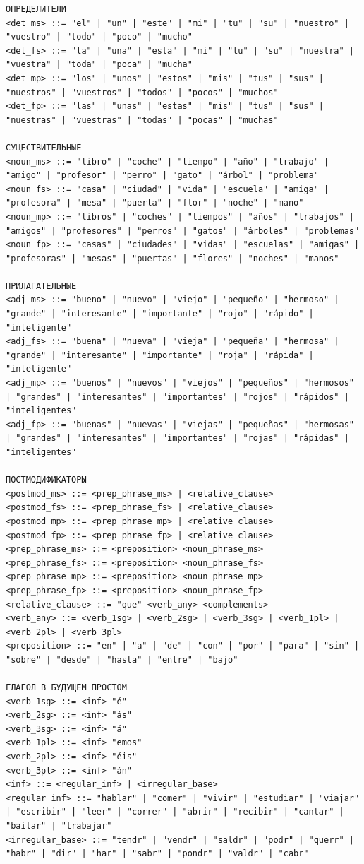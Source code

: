 \documentclass[a4paper,final]{article}
\begin{document}
{\begin{lstlisting}[caption = {Грамматика подмножества языка в БНФ}]
ОПРЕДЕЛИТЕЛИ
<det_ms> ::= "el" | "un" | "este" | "mi" | "tu" | "su" | "nuestro" | "vuestro" | "todo" | "poco" | "mucho"
<det_fs> ::= "la" | "una" | "esta" | "mi" | "tu" | "su" | "nuestra" | "vuestra" | "toda" | "poca" | "mucha"
<det_mp> ::= "los" | "unos" | "estos" | "mis" | "tus" | "sus" | "nuestros" | "vuestros" | "todos" | "pocos" | "muchos"
<det_fp> ::= "las" | "unas" | "estas" | "mis" | "tus" | "sus" | "nuestras" | "vuestras" | "todas" | "pocas" | "muchas"

СУЩЕСТВИТЕЛЬНЫЕ
<noun_ms> ::= "libro" | "coche" | "tiempo" | "año" | "trabajo" | "amigo" | "profesor" | "perro" | "gato" | "árbol" | "problema"
<noun_fs> ::= "casa" | "ciudad" | "vida" | "escuela" | "amiga" | "profesora" | "mesa" | "puerta" | "flor" | "noche" | "mano"
<noun_mp> ::= "libros" | "coches" | "tiempos" | "años" | "trabajos" | "amigos" | "profesores" | "perros" | "gatos" | "árboles" | "problemas"
<noun_fp> ::= "casas" | "ciudades" | "vidas" | "escuelas" | "amigas" | "profesoras" | "mesas" | "puertas" | "flores" | "noches" | "manos"

ПРИЛАГАТЕЛЬНЫЕ
<adj_ms> ::= "bueno" | "nuevo" | "viejo" | "pequeño" | "hermoso" | "grande" | "interesante" | "importante" | "rojo" | "rápido" | "inteligente"
<adj_fs> ::= "buena" | "nueva" | "vieja" | "pequeña" | "hermosa" | "grande" | "interesante" | "importante" | "roja" | "rápida" | "inteligente"
<adj_mp> ::= "buenos" | "nuevos" | "viejos" | "pequeños" | "hermosos" | "grandes" | "interesantes" | "importantes" | "rojos" | "rápidos" | "inteligentes"
<adj_fp> ::= "buenas" | "nuevas" | "viejas" | "pequeñas" | "hermosas" | "grandes" | "interesantes" | "importantes" | "rojas" | "rápidas" | "inteligentes"

ПОСТМОДИФИКАТОРЫ
<postmod_ms> ::= <prep_phrase_ms> | <relative_clause>
<postmod_fs> ::= <prep_phrase_fs> | <relative_clause>
<postmod_mp> ::= <prep_phrase_mp> | <relative_clause>
<postmod_fp> ::= <prep_phrase_fp> | <relative_clause>
<prep_phrase_ms> ::= <preposition> <noun_phrase_ms>
<prep_phrase_fs> ::= <preposition> <noun_phrase_fs>
<prep_phrase_mp> ::= <preposition> <noun_phrase_mp>
<prep_phrase_fp> ::= <preposition> <noun_phrase_fp>
<relative_clause> ::= "que" <verb_any> <complements>
<verb_any> ::= <verb_1sg> | <verb_2sg> | <verb_3sg> | <verb_1pl> | <verb_2pl> | <verb_3pl>
<preposition> ::= "en" | "a" | "de" | "con" | "por" | "para" | "sin" | "sobre" | "desde" | "hasta" | "entre" | "bajo"

ГЛАГОЛ В БУДУЩЕМ ПРОСТОМ
<verb_1sg> ::= <inf> "é"
<verb_2sg> ::= <inf> "ás"
<verb_3sg> ::= <inf> "á"
<verb_1pl> ::= <inf> "emos"
<verb_2pl> ::= <inf> "éis"
<verb_3pl> ::= <inf> "án"
<inf> ::= <regular_inf> | <irregular_base>
<regular_inf> ::= "hablar" | "comer" | "vivir" | "estudiar" | "viajar" | "escribir" | "leer" | "correr" | "abrir" | "recibir" | "cantar" | "bailar" | "trabajar"
<irregular_base> ::= "tendr" | "vendr" | "saldr" | "podr" | "querr" | "habr" | "dir" | "har" | "sabr" | "pondr" | "valdr" | "cabr"


\end{lstlisting}}
\end{document}
